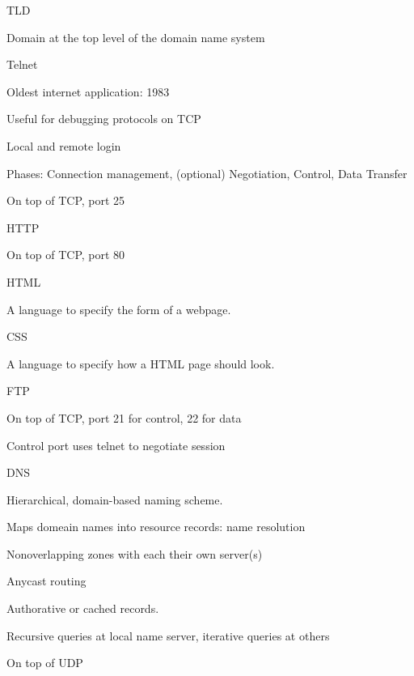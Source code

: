 \documentclass[main.tex]{subfiles}
\begin{document}
\small


\begin{card}{TLD}
\item Domain at the top level of the domain name system
\end{card}

\begin{card}{Telnet}
\item Oldest internet application: 1983
\item Useful for debugging protocols on TCP
\item Local and remote login
\item Phases: Connection management, (optional) Negotiation, Control, Data Transfer
\item On top of TCP, port 25
\end{card}

\begin{card}{HTTP}
\item On top of TCP, port 80
\end{card}
 
\begin{card}{HTML}
\item A language to specify the form of a webpage.
\end{card}

\begin{card}{CSS}
\item A language to specify how a HTML page should look.
\end{card}


\begin{card}{FTP}
\item On top of TCP, port 21 for control, 22 for data
\item Control port uses telnet to negotiate session
\end{card}

\begin{card}{DNS}
\item Hierarchical, domain-based naming scheme.
\item Maps domeain names into resource records: name resolution
\item Nonoverlapping zones with each their own server(s)
\item Anycast routing
\item Authorative or cached records.
\item Recursive queries at local name server, iterative queries at others
\item On top of UDP
\end{card}
\end{document}
